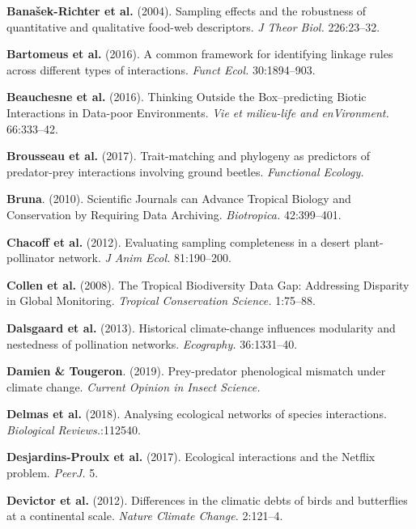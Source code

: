 \leavevmode\hypertarget{ref-BanaCatt04}{}%
\textbf{Banašek-Richter et al.} (2004). Sampling effects and the
robustness of quantitative and qualitative food-web descriptors. \emph{J
Theor Biol.} 226:23--32.

\leavevmode\hypertarget{ref-BartGrav16}{}%
\textbf{Bartomeus et al.} (2016). A common framework for identifying
linkage rules across different types of interactions. \emph{Funct Ecol.}
30:1894--903.

\leavevmode\hypertarget{ref-BeauDesj16}{}%
\textbf{Beauchesne et al.} (2016). Thinking Outside the Box--predicting
Biotic Interactions in Data-poor Environments. \emph{Vie et milieu-life
and enVironment.} 66:333--42.

\leavevmode\hypertarget{ref-BrouGrav17}{}%
\textbf{Brousseau et al.} (2017). Trait-matching and phylogeny as
predictors of predator-prey interactions involving ground beetles.
\emph{Functional Ecology.}

\leavevmode\hypertarget{ref-Brun10}{}%
\textbf{Bruna}. (2010). Scientific Journals can Advance Tropical Biology
and Conservation by Requiring Data Archiving. \emph{Biotropica.}
42:399--401.

\leavevmode\hypertarget{ref-ChacVazq12}{}%
\textbf{Chacoff et al.} (2012). Evaluating sampling completeness in a
desert plant-pollinator network. \emph{J Anim Ecol.} 81:190--200.

\leavevmode\hypertarget{ref-CollRam08}{}%
\textbf{Collen et al.} (2008). The Tropical Biodiversity Data Gap:
Addressing Disparity in Global Monitoring. \emph{Tropical Conservation
Science.} 1:75--88.

\leavevmode\hypertarget{ref-DalsTroj13}{}%
\textbf{Dalsgaard et al.} (2013). Historical climate-change influences
modularity and nestedness of pollination networks. \emph{Ecography.}
36:1331--40.

\leavevmode\hypertarget{ref-DamiToug19}{}%
\textbf{Damien \& Tougeron}. (2019). Prey-predator phenological mismatch
under climate change. \emph{Current Opinion in Insect Science.}

\leavevmode\hypertarget{ref-DelmBess18}{}%
\textbf{Delmas et al.} (2018). Analysing ecological networks of species
interactions. \emph{Biological Reviews.}:112540.

\leavevmode\hypertarget{ref-DesjLaig17}{}%
\textbf{Desjardins-Proulx et al.} (2017). Ecological interactions and
the Netflix problem. \emph{PeerJ.} 5.

\leavevmode\hypertarget{ref-Devivan12}{}%
\textbf{Devictor et al.} (2012). Differences in the climatic debts of
birds and butterflies at a continental scale. \emph{Nature Climate
Change.} 2:121--4.

